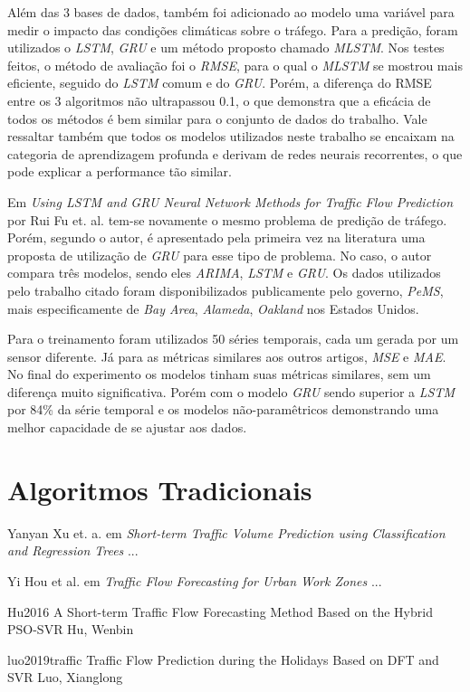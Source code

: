 Além das 3 bases de dados, também foi adicionado ao modelo uma variável para medir o impacto das condições climáticas sobre o tráfego.
Para a predição, foram utilizados o \textit{\acrshort{LSTM}}, \textit{\acrshort{GRU}} e um método proposto chamado \textit{\acrfull{MLSTM}}. Nos testes feitos, o método de avaliação foi o \textit{\acrshort{RMSE}}, para o qual o \textit{\acrshort{MLSTM}} se mostrou mais eficiente, seguido do \textit{\acrshort{LSTM}} comum e do \textit{\acrshort{GRU}}. Porém, a diferença do RMSE entre os 3 algoritmos não ultrapassou 0.1, o que demonstra que a eficácia de todos os métodos é bem similar para o conjunto de dados do trabalho. Vale ressaltar também que todos os modelos utilizados neste trabalho se encaixam na categoria de aprendizagem profunda e derivam de redes neurais recorrentes, o que pode explicar a performance tão similar.

Em \textit{Using LSTM and GRU Neural Network Methods for Traffic Flow Prediction} \cite{fu2016using} por Rui Fu et. al. tem-se novamente o mesmo problema de predição de tráfego. Porém, segundo o autor, é apresentado pela primeira vez na literatura uma proposta de utilização de \textit{\acrfull{GRU}} para esse tipo de problema. No caso, o autor compara três modelos, sendo eles \textit{\acrshort{ARIMA}}, \textit{\acrshort{LSTM}} e \textit{\acrshort{GRU}}. Os dados utilizados pelo trabalho citado foram disponibilizados publicamente pelo governo, \textit{PeMS}, mais especificamente de \textit{Bay Area}, \textit{Alameda}, \textit{Oakland} nos Estados Unidos. 

Para o treinamento foram utilizados 50 séries temporais, cada um gerada por um sensor diferente. Já para as métricas similares aos outros artigos, \textit{\acrshort{MSE}} e \textit{\acrshort{MAE}}. No final do experimento os modelos tinham suas métricas similares, sem um diferença muito significativa. Porém com o modelo \textit{\acrshort{GRU}} sendo superior a \textit{\acrshort{LSTM}} por 84\% da série temporal e os modelos não-paramêtricos demonstrando uma melhor capacidade de se ajustar aos dados.

\section{Algoritmos Tradicionais}

Yanyan Xu et. a. em \textit{Short-term Traffic Volume Prediction using Classification and Regression Trees} \cite{xu2013short} ...

Yi Hou et al. em \textit{Traffic Flow Forecasting for Urban Work Zones} \cite{hou2014traffic} ...


Hu2016
A Short-term Traffic Flow Forecasting Method Based on the Hybrid PSO-SVR
Hu, Wenbin


luo2019traffic
Traffic Flow Prediction during the Holidays Based on DFT and SVR
Luo, Xianglong